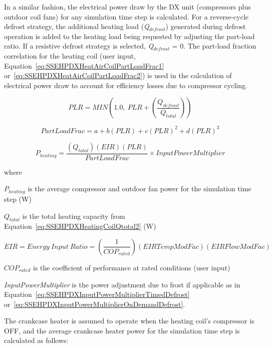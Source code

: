 In a similar fashion, the electrical power draw by the DX unit (compressors plus outdoor coil fans) for any simulation time step is calculated. For a reverse-cycle defrost strategy, the additional heating load (\emph{Q\(_{defrost}\)}) generated during defrost operation is added to the heating load being requested by adjusting the part-load ratio. If a resistive defrost strategy is selected, \emph{Q\(_{defrost}\)} = 0. The part-load fraction correlation for the heating coil (user input, Equation~\ref{eq:SSEHPDXHeatAirCoilPartLoadFrac1} or~\ref{eq:SSEHPDXHeatAirCoilPartLoadFrac2}) is used in the calculation of electrical power draw to account for efficiency losses due to compressor cycling.

\begin{equation}
  PLR = MIN \left( 1.0,~PLR + \left( \frac{Q_{defrost}}{Q_{total}} \right) \right)
\end{equation}

\begin{equation}
PartLoadFrac = a + b\left( {PLR} \right) + c{\left( {PLR} \right)^2} + d{\left( {PLR} \right)^3}
\end{equation}

\begin{equation}
  P_{heating} = \frac{{\left( {{Q_{total}}} \right)\left( {EIR} \right)\left( {PLR} \right)}}{{PartLoadFrac}} \times InputPowerMultiplier
\end{equation}

where

\({P_{heating}}\) is the average compressor and outdoor fan power for the simulation time step (W)

\({Q_{total}}\) is the total heating capacity from Equation~\ref{eq:SSEHPDXHeatingCoilQtotal2} (W)

\begin{equation}
  EIR = Energy~Input~Ratio = \left( {\frac{1}{{CO{P_{rated}}}}} \right)\left( {EIRTempModFac} \right)\left( {EIRFlowModFac} \right)
\end{equation}

\(CO{P_{rated}}\) is the coefficient of performance at rated conditions (user input)

\emph{InputPowerMultiplier} is the power adjustment due to frost if applicable as in Equation~\ref{eq:SSEHPDXInputPowerMultiplierTimedDefrost} or~\ref{eq:SSEHPDXInputPowerMultiplierOnDemandDefrost}.

The crankcase heater is assumed to operate when the heating coil's compressor is OFF, and the average crankcase heater power for the simulation time step is calculated as follows:

